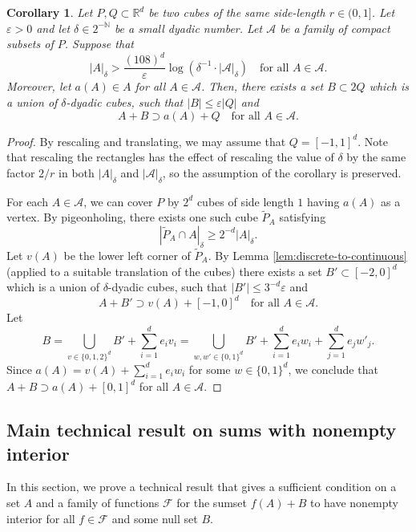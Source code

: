 \documentclass[12pt]{amsart}
\newcommand{\e}{\varepsilon}
\newtheorem{corollary}[theorem]{Corollary}
\def\R{{\mathbb{R}}}
\def\N{{\mathbb{N}}}
\numberwithin{theorem}{section}
\numberwithin{equation}{section}
\begin{document}
\begin{corollary} \label{cor:discrete-to-continuous}
    Let $P,Q\subset\R^d$ be two cubes of the same side-length $r\in (0,1]$. Let $\e>0$ and let $\delta\in 2^{-\N}$ be a small dyadic number. Let $\mathcal{A}$ be a family of compact subsets of $P$. Suppose that
    \[
        |A|_{\delta}> \frac{(108)^d}{\e}\log\left(\delta^{-1}\cdot|\mathcal{A}|_{\delta}\right) \quad\text{for all }A\in\mathcal{A}.
    \]
    Moreover, let $a(A)\in A$ for all $A\in\mathcal{A}$.
    Then, there exists a set $B\subset 2Q$ which is a union of $\delta$-dyadic cubes, such that $|B|\le \e|Q|$ and
    \[
        A+B \supset a(A)+Q \quad\text{for all }A\in\mathcal{A}.
    \]
\end{corollary}
\begin{proof}
    By rescaling and translating, we may assume that $Q=[-1,1]^d$. Note that rescaling the rectangles has the effect of rescaling the value of $\delta$ by the same factor $2/r$ in both $|A|_{\delta}$ and $|\mathcal{A}|_{\delta}$, so the assumption of the corollary is preserved.

    For each $A\in\mathcal{A}$, we can cover $P$ by $2^d$ cubes of side length $1$ having $a(A)$ as a vertex. By pigeonholing, there exists one such cube $\tilde{P}_A$ satisfying
    \[
     |\widetilde{P}_A \cap A|_{\delta} \ge 2^{-d}|A|_{\delta}.
    \]
    Let $v(A)$ be the lower left corner of $\tilde{P}_A$. By Lemma \ref{lem:discrete-to-continuous} (applied to a suitable translation of the cubes) there exists a set $B'\subset [-2,0]^d$ which is a union of $\delta$-dyadic cubes, such that $|B'|\le 3^{-d}\e$ and
    \[
      A+B' \supset v(A)+[-1,0]^d \quad\text{for all }A\in\mathcal{A}.
    \]
    Let
    \[
        B = \bigcup_{v\in \{0,1,2\}^d} B'+\sum_{i=1}^d e_i v_i = \bigcup_{w,w'\in\{0,1\}^d} B'+\sum_{i=1}^d e_i w_i + \sum_{j=1}^d e_j w'_j.
    \]
    Since $a(A)=v(A)+\sum_{i=1}^d e_i w_i$ for some $w\in\{0,1\}^d$, we conclude that $A+B\supset a(A)+[0,1]^d$ for all $A\in\mathcal{A}$.
\end{proof}

\subsection{Main technical result on sums with nonempty interior}

In this section, we prove a technical result that gives a sufficient condition on a set $A$ and a family of functions $\mathcal{F}$ for the sumset $f(A)+B$ to have nonempty interior for all $f\in\mathcal{F}$ and some null set $B$.
\end{document}
